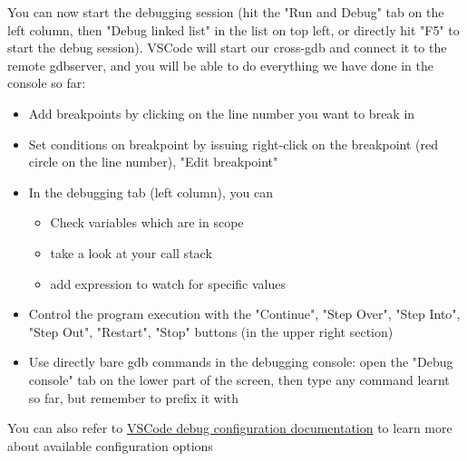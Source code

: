 You can now start the debugging session (hit the "Run and Debug"
tab on the left column, then "Debug linked list" in the list on top left, or
directly hit "F5" to start the debug session).
VSCode will start our cross-gdb and connect it to the remote gdbserver, and you
will be able to do everything we have done in the console so far:
\begin{itemize}
  \item Add breakpoints by clicking on the line number you want to break in
  \item Set conditions on breakpoint by issuing right-click on the breakpoint
  (red circle on the line number), "Edit breakpoint"
  \item In the debugging tab (left column), you can
  \begin{itemize}
    \item Check variables which are in scope
    \item take a look at your call stack
    \item add expression to watch for specific values
  \end{itemize}
  \item Control the program execution with the "Continue", "Step Over", "Step
  Into", "Step Out", "Restart", "Stop" buttons (in the upper right section)
  \item Use directly bare gdb commands in the debugging console: open the
  "Debug console" tab on the lower part of the screen, then type any command
  learnt so far, but remember to prefix it with 
\end{itemize}

You can also refer to
\href{https://code.visualstudio.com/docs/editor/debugging}{VSCode debug
configuration documentation} to learn more about available configuration options
